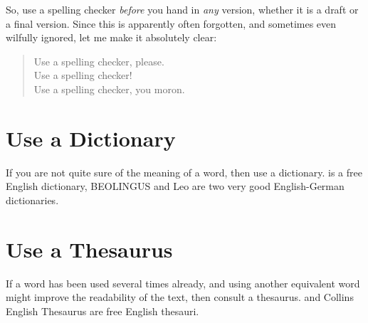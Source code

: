 So, use a spelling checker \emph{before} you hand in \emph{any}
version, whether it is a draft or a final version.
Since this is apparently often forgotten, and sometimes even wilfully
ignored, let me make it absolutely clear:
\begin{quote}
\begin{em}
Use a spelling checker, please. \\
Use a spelling checker! \\
Use a spelling checker, you moron. \\
\end{em}
\end{quote}




\section{Use a Dictionary}
\label{sec:dictionary}

If you are not quite sure of the meaning of a word, then use a
dictionary.  \parencite{DictionaryCom} is a
free English dictionary, BEOLINGUS \parencite{DictChemnitz} and Leo
\parencite{DictLeoOrg} are two very good English-German dictionaries.




\section{Use a Thesaurus}
\label{sec:thesaurus}

If a word has been used several times already, and using another
equivalent word might improve the readability of the text, then
consult a thesaurus.  \parencite{ThesaurusCom}
and Collins English Thesaurus \parencite{CollinsThesaurus} are free
English thesauri.

